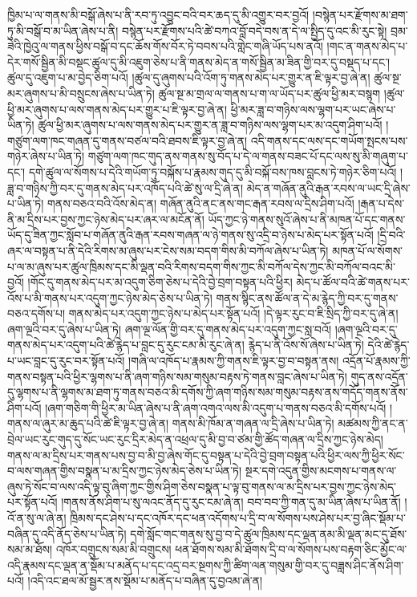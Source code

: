 ཁྱིམ་པ་ལ་གནས་མི་བསྒོ་ཞེས་པ་ནི་རབ་ཏུ་འབྱུང་བའི་བར་ཆད་དུ་མི་འགྱུར་བར་བྱའོ། །བསྙེན་པར་རྫོགས་མ་ཐག་ཏུ་མི་བསྒོ་བ་མ་ཡིན་ཞེས་པ་ནི། བསྙེན་པར་རྫོགས་པའི་ཚེ་བཀའ་བློ་བདེ་བས་ན་དེ་ལ་སྤྱིད་དུ་འང་མི་རུང་སྟེ། བྲམ་ཟེའི་ཁྱེའུ་ལ་གནས་ཕྱིས་བསྒོ་བ་དང་ཆོས་གོས་བོར་ཏེ་བབས་པའི་གླེང་གཞི་ཡོད་པས་ནའོ། །གང་ན་གནས་མེད་པ་དེར་གསོ་སྦྱིན་མི་བསྡང་ཚུལ་དུ་མི་འཇུག་ཅེས་པ་ནི་གནས་མེད་ན་གསོ་སྦྱིན་མ་ཟིན་གྱི་བར་དུ་བསྡད་པ་དང་། ཚུལ་དུ་འཇུག་པ་མ་བྱེད་ཅིག་པའོ། །ཚུལ་དུ་ཞུགས་པའི་འོག་ཏུ་གནས་མེད་པར་གྱུར་ན་ཇི་ལྟར་བྱ་ཞེ་ན། ཚུལ་སྔ་མར་ཞུགས་པ་མི་བསྲུངས་ཞེས་པ་ཡིན་ཏེ། ཚུལ་སྔ་མ་གྲལ་ལ་གནས་པ་ག་ལ་ཡོད་པར་ཚུལ་ཕྱི་མར་བསྙག །ཚུལ་ཕྱི་མར་ཞུགས་པ་ལས་གནས་མེད་པར་གྱུར་པ་ཇི་ལྟར་བྱ་ཞེ་ན། ཕྱི་མར་ཟླ་བ་གཉིས་ལས་ལྷག་པར་ཡང་ཞེས་པ་ཡིན་ཏེ། ཚུལ་ཕྱི་མར་ཞུགས་པ་ལས་གནས་མེད་པར་གྱུར་ན་ཟླ་བ་གཉིས་ལས་ལྷག་པར་མ་འདུག་ཤིག་པའོ། །གཙུག་ལག་ཁང་གཞན་དུ་གནས་བཙལ་བའི་ཐབས་ཇི་ལྟར་བྱ་ཞེ་ན། འདི་གནས་དང་ལས་དང་གཡོག་སྤངས་པས་གཉེར་ཞེས་པ་ཡིན་ཏེ། གཙུག་ལག་ཁང་གུད་ནས་གནས་སུ་བོད་པ་དེ་ལ་གནས་བཟང་པོ་དང་ལས་སུ་མི་གཞུག་པ་དང་། དགེ་ཚུལ་ལ་སོགས་པ་དེའི་གཡོག་ཏུ་བསྐོས་པ་རྣམས་གུད་དུ་མི་བསྐོ་བས་ཁས་བླངས་ཏེ་གཉེར་ཅིག་པའོ། །ཟླ་བ་གཉིས་ཀྱི་བར་དུ་གནས་མེད་པར་འཁོད་པའི་ཚེ་སུ་ལ་དྲི་ཞེ་ན། མེད་ན་གཞོན་ནུའི་རྒན་རབས་ལ་ཡང་དྲི་ཞེས་པ་ཡིན་ཏེ། གནས་བཅའ་བའི་འོས་མེད་ན། གཞོན་ནུའི་ནང་ནས་གང་རྒན་རབས་ལ་དྲིས་ཤིག་པའོ། །རྒན་པ་དེས་ནི་མ་དྲིས་པར་བྱས་ཀྱང་ཉེས་མེད་པར་ཞར་ལ་མངོན་ནོ། ཡོད་ཀྱང་ཉེ་གནས་སུའོ་ཞེས་པ་ནི་མཁན་པོ་དང་གནས་ཡོད་དུ་ཟིན་ཀྱང་སློབ་པ་གཞོན་ནུའི་རྒན་རབས་གཞན་ལ་ཉེ་གནས་སུ་འདྲི་བ་ཉེས་པ་མེད་པར་སྟོན་པའོ། །དྲི་བའི་ཞར་ལ་བསྟན་པ་ནི་དེའི་རིགས་མ་ཞུས་པར་ངེས་སམ་བདག་གིས་མི་བཀོལ་ཞེས་པ་ཡིན་ཏེ། མཁན་པོ་ལ་སོགས་པ་ལ་མ་ཞུས་པར་ཚུལ་ཁྲིམས་དང་མི་ལྡན་བའི་རིགས་བདག་གིས་ཀྱང་མི་བཀོལ་དེས་ཀྱང་མི་བཀོལ་བའང་མི་བྱའོ། །གོང་དུ་གནས་མེད་པར་མ་འདུག་ཅིག་ཅེས་པ་དེའི་བྱེ་བྲག་བསྟན་པའི་ཕྱིར། མེད་པ་ཚོལ་བའི་ཚེ་གནས་པར་འོས་པ་མི་གནས་པར་འདུག་ཀྱང་ཉེས་མེད་ཅེས་པ་ཡིན་ཏེ། གནས་སྙིང་ནས་ཚོལ་ན་དེ་མ་རྙེད་ཀྱི་བར་དུ་གནས་བཅའ་དགོས་པ། གནས་མེད་པར་འདུག་ཀྱང་ཉེས་པ་མེད་པར་སྟོན་པའོ། །དེ་ལྟར་རུང་བ་ཇི་སྲིད་ཀྱི་བར་དུ་ཞེ་ན། ཞག་ལྔའི་བར་དུ་ཞེས་པ་ཡིན་ཏེ། ཞག་ལྔ་ལོན་གྱི་བར་དུ་གནས་མེད་པར་འདུག་ཀྱང་སླ་བའོ། །ཞག་ལྔའི་བར་དུ་གནས་མེད་པར་འདུག་པའི་ཚེ་རྙེད་པ་བླང་དུ་རུང་ངམ་མི་རུང་ཞེ་ན། རྙེད་པ་ནི་འོས་སོ་ཞེས་པ་ཡིན་ཏེ། དེའི་ཚེ་རྙེད་པ་ཡང་བླང་དུ་རུང་བར་སྟོན་པའོ། །གཞི་ལ་འཁོད་པ་རྣམས་ཀྱི་གནས་ཇི་ལྟར་བྱ་བ་བསྟན་ནས། འདྲོན་པོ་རྣམས་ཀྱི་གནས་བསྟན་པའི་ཕྱིར་ལྷགས་པ་ནི་ཞག་གཉིས་སམ་གསུམ་བརྟས་ཏེ་གནས་བླང་ཞེས་པ་ཡིན་ཏེ། གུད་ནས་འདྲོན་དུ་ལྷགས་པ་ནི་ལྷགས་མ་ཐག་ཏུ་གནས་བཅའ་མི་དགོས་ཀྱི་ཞག་གཉིས་སམ་གསུམ་བརྟས་ནས་གདོད་གནས་ནོས་ཤིག་པའོ། །ཞག་གཅིག་གི་ཕྱིར་མ་ཡིན་ཞེས་པ་ནི་ཞག་འགའ་ལས་མི་འདུག་པ་གནས་བཅའ་མི་དགོས་པའོ། །གནས་ལ་ཞུར་མ་ཆུད་པའི་ཚེ་ཇི་ལྟར་བྱ་ཞེ་ན། གནས་མི་ཁོམ་ན་གཞན་ལ་དྲི་ཞེས་པ་ཡིན་ཏེ། མཚམས་ཀྱི་ནང་ན་བྲེལ་ཡང་རུང་གུད་དུ་སོང་ཡང་རུང་དྲིར་མེད་ན་འཕྲལ་དུ་མི་བྱ་བ་ཙམ་གྱི་ཚོད་གཞན་ལ་དྲིས་ཀྱང་ཉེས་མེད། གནས་ལ་མ་དྲིས་པར་གནས་པས་བྱ་བ་མི་བྱ་ཞེས་གོང་དུ་བསྟན་པ་དེའི་བྱེ་བྲག་བསྟན་པའི་ཕྱིར་ལས་ཀྱི་ཕྱིར་སོང་བ་ལས་གཞན་གྱིས་བསྣན་པ་མ་དྲིས་ཀྱང་ཉེས་མེད་ཅེས་པ་ཡིན་ཏེ། སྔར་དགེ་འདུན་གྱིས་མངགས་པ་གནས་ལ་ཞུས་ཏེ་སོང་བ་ལས་འདི་ལྟ་བུ་ཞིག་ཀྱང་གྱིས་ཤིག་ཅེས་བསྣན་པ་ལྟ་བུ་གནས་ལ་མ་དྲིས་པར་བྱས་ཀྱང་ཉེས་མེད་པར་སྟོན་པའོ། །གནས་ནོས་ཤིག་པ་སུ་ལའང་ནོད་དུ་རུང་ངམ་ཞེ་ན། བབ་བབ་ཀྱི་གན་དུ་མ་ཡིན་ཞེས་པ་ཡིན་ནོ། །འོ་ན་སུ་ལ་ཞེ་ན། ཁྲིམས་དང་ཤེས་པ་དང་འཁོར་དང་ཕན་འདོགས་པ་དྲི་བ་ལ་སོགས་པས་ཤེས་པར་བྱ་ཞིང་སྡོམ་པ་བཞིན་དུ་འདི་ནོད་ཅེས་པ་ཡིན་ཏེ། དགེ་སློང་གང་གནས་སུ་བྱ་བ་དེ་ཚུལ་ཁྲིམས་དང་ལྡན་ནམ་མི་ལྡན་མང་དུ་ཐོས་སམ་མ་ཐོས། འཁོར་བགྲུངས་སམ་མི་བགྲུངས། ཕན་ཐོགས་སམ་མི་ཐོགས་དྲི་བ་ལ་སོགས་པས་བརྟག་ཅིང་མྱོང་ལ་འདི་རྣམས་དང་ལྡན་ན་སྡོམ་པ་མནོད་པ་དང་འདྲ་བར་སྔགས་ཀྱི་ཚིག་ལན་གསུམ་གྱི་བར་དུ་བཟླས་ཤིང་ནོས་ཤིག་པའོ། །འདི་འང་ཐལ་མོ་སྦྱར་ནས་སྡོམ་པ་མནོད་པ་བཞིན་དུ་བྱའམ་ཞེ་ན། 